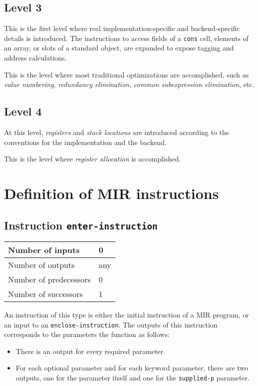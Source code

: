 \subsection{Level 3}

This is the first level where real implementation-specific and
backend-specific details is introduced.  The instructions to access
fields of a \texttt{cons} cell, elements of an array, or slots of a
standard object, are expanded to expose tagging and address
calculations.

This is the level where most traditional optimizations are
accomplished, such as \emph{value numbering}, \emph{redundancy
  elimination}, \emph{common subexpression elimination}, etc.

\subsection{Level 4}

At this level, \emph{registers} and \emph{stack locations} are
introduced according to the conventions for the implementation and the
backend. 

This is the level where \emph{register allocation} is accomplished.

\section{Definition of MIR instructions}
\label{sec-mir-instructions}

\subsection{Instruction \texttt{enter-instruction}}
\label{mir-instruction-enter}

\begin{tabular}{|l|l|}
\hline
Number of inputs & 0\\
\hline
Number of outputs & any\\
\hline
Number of predecessors & 0\\
\hline
Number of successors & 1\\
\hline
\end{tabular}

An instruction of this type is either the initial instruction of a MIR
program, or an input to an \texttt{enclose-instruction}.  The outputs
of this instruction corresponds to the parameters the function as
follows: 

\begin{itemize}
\item There is an output for every required parameter.
\item For each optional parameter and for each keyword parameter,
  there are two outputs, one for the parameter itself and one for the
  \texttt{supplied-p} parameter.
\end{itemize}

